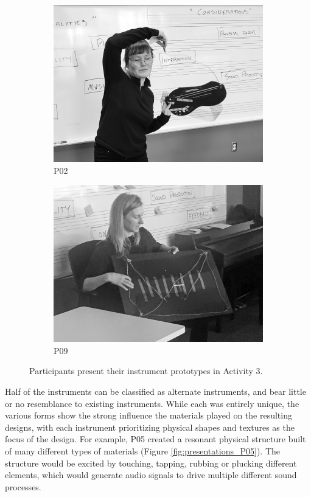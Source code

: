 \documentclass[letterpaper, 12pt]{article}
\begin{document}
\begin{figure}[t]
\begin{subfigure}{0.49\textwidth}
        \includegraphics[width=1\textwidth]{P02.jpg}
        \caption{P02}
        \label{fig:presentations_P02}
    \end{subfigure}
    \begin{subfigure}{0.49\textwidth}
        \centering
        \includegraphics[width=1\textwidth]{P09.jpg}
        \caption{P09}
        \label{fig:presentations_P09}
    \end{subfigure}
    \caption{Participants present their instrument prototypes in Activity 3.}
    \label{fig:presentations}
\end{figure}

Half of the instruments can be classified as alternate instruments, and bear little or no resemblance to existing instruments. While each was entirely unique, the various forms show the strong influence the materials played on the resulting designs, with each instrument prioritizing physical shapes and textures as the focus of the design. For example, P05 created a resonant physical structure built of many different types of materials (Figure \ref{fig:presentations_P05}). The structure would be excited by touching, tapping, rubbing or plucking different elements, which would generate audio signals to drive multiple different sound processes.
\end{document}

